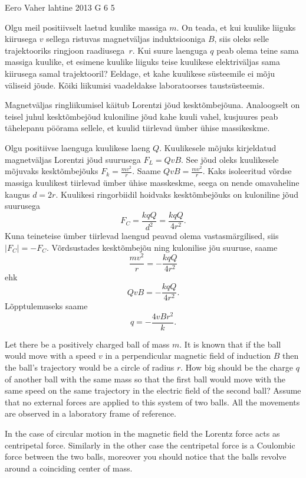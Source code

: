 {Eero Vaher} %
{lahtine} %
{2013} %
{G 6} %
{5} %
{
\ifStatement
Olgu meil positiivselt laetud kuulike massiga $m$. On teada, et kui kuulike
liiguks kiirusega $v$ sellega ristuvas magnetväljas induktsiooniga $B$,
siis oleks selle trajektooriks ringjoon raadiusega~$r$. Kui suure laenguga $q$ peab olema teine sama massiga kuulike, et esimene
kuulike liiguks teise kuulikese elektriväljas sama kiirusega samal trajektooril? Eeldage, et
kahe kuulikese süsteemile ei mõju väliseid jõude. Kõiki liikumisi vaadeldakse
laboratoorses taustsüsteemis.
\pagebreak
\fi


\ifHint
Magnetväljas ringliikumisel käitub Lorentzi jõud kesktõmbejõuna. Analoogselt on teisel juhul kesktõmbejõud kuloniline jõud kahe kuuli vahel, kusjuures peab tähelepanu pöörama sellele, et kuulid tiirlevad ümber ühise massikeskme.
\fi


\ifSolution
Olgu positiivse laenguga kuulikese laeng $Q$. Kuulikesele mõjuks kirjeldatud magnetväljas Lorentzi jõud suurusega $F_L=QvB$. See jõud oleks kuulikesele mõjuvaks kesktõmbejõuks $F_k=\frac{mv^2}{r}$. Saame $QvB=\frac{mv^2}{r}$. Kaks isoleeritud võrdse massiga kuulikest tiirlevad ümber ühise masskeskme, seega on nende omavaheline kaugus $d=2r$. Kuulikesi ringorbiidil hoidvaks kesktõmbejõuks on kuloniline jõud suurusega 
\[
F_C=\frac{kqQ}{d^2}=\frac{kqQ}{4r^2}.
\]
Kuna teineteise ümber tiirlevad laengud peavad olema vastasmärgilised, siis $|F_C|=-F_C$. Võrdsustades kesktõmbejõu ning kulonilise jõu suuruse, saame
\[
\frac{mv^2}{r}=-\frac{kqQ}{4r^2}
\]
ehk
\[
QvB=-\frac{kqQ}{4r^2}.
\]
Lõpptulemuseks saame 
\[
q=-\frac{4vBr^2}{k}.
\]
\fi


\ifEngStatement
Let there be a positively charged ball of mass $m$. It is known that if the ball would move with a speed $v$ in a perpendicular magnetic field of induction $B$ then the ball’s trajectory would be a circle of radius $r$. How big should be the charge $q$ of another ball with the same mass so that the first ball would move with the same speed on the same trajectory in the electric field of the second ball? Assume that no external forces are applied to this system of two balls. All the movements are observed in a laboratory frame of reference.
\fi


\ifEngHint
In the case of circular motion in the magnetic field the Lorentz force acts as centripetal force. Similarly in the other case the centripetal force is a Coulombic force between the two balls, moreover you should notice that the balls revolve around a coinciding center of mass.
\fi


}
